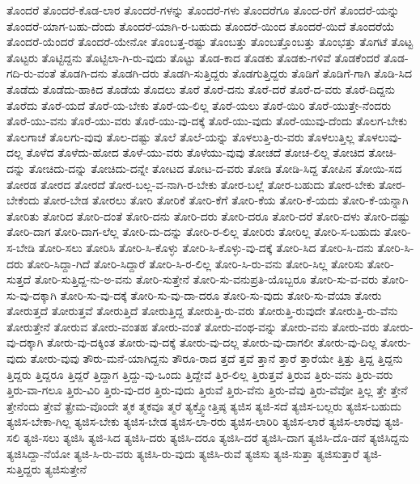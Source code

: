 {ತೊಂದರೆ
ತೊಂದರೆ-ಕೊಡ-ಲಾರ
ತೊಂದರೆ-ಗಳನ್ನು
ತೊಂದರೆ-ಗಳು
ತೊಂದರೆಗೂ
ತೊಂದ-ರೆಗೆ
ತೊಂದರೆ-ಯನ್ನು
ತೊಂದರೆ-ಯಾಗ-ಬಹು-ದೆಂದು
ತೊಂದರೆ-ಯಾಗಿ-ರ-ಬಹುದು
ತೊಂದರೆ-ಯಿಂದ
ತೊಂದರೆ-ಯಿದೆ
ತೊಂದರೆಯೆ
ತೊಂದರೆ-ಯೆಂದರೆ
ತೊಂದರೆ-ಯೇನೋ
ತೊಂಬತ್ತ-ರಷ್ಟು
ತೊಂಬತ್ತು
ತೊಂಬತ್ತೊಂಬತ್ತು
ತೊಂಭತ್ತು
ತೊಗಟೆ
ತೊಟ್ಟ
ತೊಟ್ಟರು
ತೊಟ್ಟಿದ್ದನು
ತೊಟ್ಟಿಲಾ-ಗಿ-ರು-ವುದು
ತೊಟ್ಟು
ತೊಡ-ಕಾದ
ತೊಡಕು
ತೊಡಕು-ಗಳಿವೆ
ತೊಡಕೆಂದರೆ
ತೊಡ-ಗದಿ-ರು-ವಂತೆ
ತೊಡಗಿ-ದನು
ತೊಡಗಿ-ದರು
ತೊಡಗಿ-ಸುತ್ತಿದ್ದರು
ತೊಡಗುತ್ತಿದ್ದರು
ತೊಡಿಗೆ
ತೊಡಿಗೆ-ಗಾಗಿ
ತೊಡಿ-ಸಿದ
ತೊಡೆದು
ತೊಡೆದು-ಹಾಕಿದ
ತೊಡೆಯ
ತೊದಲು
ತೊರೆ
ತೊರೆ-ದನು
ತೊರೆ-ದರೆ
ತೊರೆ-ದ-ವರು
ತೊರೆ-ದಿದ್ದನು
ತೊರೆದು
ತೊರೆ-ಯದೆ
ತೊರೆ-ಯ-ಬೇಕು
ತೊರೆ-ಯ-ಲಿಲ್ಲ
ತೊರೆ-ಯಲು
ತೊರೆ-ಯಿರಿ
ತೊರೆ-ಯುತ್ತೇ-ನೆಂದರು
ತೊರೆ-ಯು-ವನು
ತೊರೆ-ಯು-ವರು
ತೊರೆ-ಯು-ವು-ದಕ್ಕೆ
ತೊರೆ-ಯು-ವುದು
ತೊರೆ-ಯುವು-ದೆಂದು
ತೊಲಗ-ಬೇಕು
ತೊಲಗಾಚೆ
ತೊಲಗು-ವುವು
ತೊಲ-ದಷ್ಟು
ತೊಲೆ
ತೊಲೆ-ಯನ್ನು
ತೊಳಲುತ್ತಿ-ರು-ವರು
ತೊಳಲುತ್ತಿಲ್ಲ
ತೊಳಲುವು-ದಲ್ಲ
ತೊಳೆದ
ತೊಳೆದು-ಹೋದ
ತೊಳೆ-ಯು-ವರು
ತೊಳೆಯು-ವುವು
ತೋಚದೆ
ತೋಚ-ಲಿಲ್ಲ
ತೋಚಿದ
ತೋಚಿ-ದನ್ನು
ತೋಚಿದು-ದನ್ನು
ತೋಚಿದು-ದನ್ನೇ
ತೋಟದ
ತೋಟ-ದ-ವರು
ತೋಡಿ
ತೋಡಿ-ಸಿದ್ದ
ತೋಪಿನ
ತೋಯಿ-ಸದ
ತೋರಡ
ತೋರದ
ತೋರದೆ
ತೋರ-ಬಲ್ಲ-ವ-ನಾಗಿ-ರ-ಬೇಕು
ತೋರ-ಬಲ್ಲೆ
ತೋರ-ಬಹುದು
ತೋರ-ಬೇಕು
ತೋರ-ಬೇಕೆಂದು
ತೋರ-ಬೇಡ
ತೋರಲು
ತೋರಿ
ತೋರಿಕೆ
ತೋರಿ-ಕೆಗೆ
ತೋರಿ-ಕೆಯ
ತೋರಿ-ಕೆ-ಯದು
ತೋರಿ-ಕೆ-ಯನ್ನಾಗಿ
ತೋರಿತು
ತೋರಿದ
ತೋರಿ-ದಂತೆ
ತೋರಿ-ದನು
ತೋರಿ-ದರು
ತೋರಿ-ದರೂ
ತೋರಿ-ದರೆ
ತೋರಿ-ದಳು
ತೋರಿ-ದಷ್ಟು
ತೋರಿ-ದಾಗ
ತೋರಿ-ದಾಗ-ಲೆಲ್ಲ
ತೋರಿ-ದು-ದನ್ನು
ತೋರಿ-ರ-ಲಿಲ್ಲ
ತೋರಿರು
ತೋರಿಲ್ಲ
ತೋರಿ-ಸ-ಬಹುದು
ತೋರಿ-ಸ-ಬೇಡಿ
ತೋರಿ-ಸಲು
ತೋರಿಸಿ
ತೋರಿ-ಸಿ-ಕೊಳ್ಳು
ತೋರಿ-ಸಿ-ಕೊಳ್ಳು-ವು-ದಕ್ಕೆ
ತೋರಿ-ಸಿದ
ತೋರಿ-ಸಿ-ದನು
ತೋರಿ-ಸಿ-ದರು
ತೋರಿ-ಸಿದ್ದಾ-ಗಿದೆ
ತೋರಿ-ಸಿದ್ದಾರೆ
ತೋರಿ-ಸಿ-ರ-ಲಿಲ್ಲ
ತೋರಿ-ಸಿ-ರು-ವನು
ತೋರಿ-ಸಿಲ್ಲ
ತೋರಿಸು
ತೋರಿ-ಸುತ್ತದೆ
ತೋರಿ-ಸುತ್ತಿದ್ದ-ನು-ಅ-ವನು
ತೋರಿ-ಸುತ್ತೇನೆ
ತೋರಿ-ಸು-ವನುಪ್ರತಿ-ಯೊಬ್ಬರೂ
ತೋರಿ-ಸು-ವ-ವರು
ತೋರಿ-ಸು-ವು-ದಕ್ಕಾಗಿ
ತೋರಿ-ಸು-ವು-ದಕ್ಕೆ
ತೋರಿ-ಸು-ವು-ದಾ-ದರೂ
ತೋರಿ-ಸು-ವುದು
ತೋರಿ-ಸು-ವೆಯಾ
ತೋರು
ತೋರುತ್ತದೆ
ತೋರುತ್ತವೆ
ತೋರುತ್ತಿದೆ
ತೋರುತ್ತಿದ್ದ
ತೋರುತ್ತಿ-ರು-ವರು
ತೋರುತ್ತಿ-ರುವುದೇ
ತೋರುತ್ತಿ-ರು-ವೆನು
ತೋರುತ್ತೇನೆ
ತೋರುವ
ತೋರು-ವಂತಹ
ತೋರು-ವಂತೆ
ತೋರು-ವಂಥ-ವನ್ನು
ತೋರು-ವನು
ತೋರು-ವರು
ತೋರು-ವು-ದಕ್ಕಾಗಿ
ತೋರು-ವು-ದಕ್ಕಿಂತ
ತೋರು-ವು-ದಕ್ಕೆ
ತೋರು-ವು-ದಲ್ಲ
ತೋರು-ವು-ದಾಗಲೀ
ತೋರು-ವು-ದಿಲ್ಲ
ತೋರು-ವುದು
ತೋರು-ವುವು
ತೌರು-ಮನೆ-ಯಾಗಿದ್ದನು
ತೌರೂ-ರಾದ
ತ್ತದೆ
ತ್ತವೆ
ತ್ತಾನೆ
ತ್ತಾರೆ
ತ್ತಾರೆಯೇ
ತ್ತಿತ್ತು
ತ್ತಿದ್ದ
ತ್ತಿದ್ದನು
ತ್ತಿದ್ದರು
ತ್ತಿದ್ದರೂ
ತ್ತಿದ್ದರೆ
ತ್ತಿದ್ದಾಗ
ತ್ತಿದ್ದು-ವು-ಒಂದು
ತ್ತಿದ್ದೇವೆ
ತ್ತಿರ-ಲಿಲ್ಲ
ತ್ತಿರುತ್ತವೆ
ತ್ತಿರುವ
ತ್ತಿರು-ವನು
ತ್ತಿರು-ವರು
ತ್ತಿರು-ವಾ-ಗಲೂ
ತ್ತಿರು-ವಿರಿ
ತ್ತಿರು-ವು-ದರ
ತ್ತಿರು-ವುದು
ತ್ತಿರುವೆ
ತ್ತಿರು-ವೆನು
ತ್ತಿರು-ವೆವು
ತ್ತಿರು-ವೆವೋ
ತ್ತಿಲ್ಲ
ತ್ತೇ
ತ್ತೇನೆ
ತ್ತೇನೆಂದು
ತ್ತೇವೆ
ತ್ಪ್ರೇಮ-ವೊಂದೇ
ತ್ಮಕ
ತ್ಮಕವೂ
ತ್ಮರೆ
ತ್ಯಕ್ತ್ವೋತ್ತಿಷ್ಠ
ತ್ಯಜಿಸ
ತ್ಯಜಿ-ಸದೆ
ತ್ಯಜಿಸ-ಬಲ್ಲರು
ತ್ಯಜಿಸ-ಬಹುದು
ತ್ಯಜಿಸ-ಬೇಕಾ-ಗಿಲ್ಲ
ತ್ಯಜಿಸ-ಬೇಕು
ತ್ಯಜಿಸ-ಬೇಡ
ತ್ಯಜಿಸ-ಲಾ-ರರು
ತ್ಯಜಿಸ-ಲಾರಿರಿ
ತ್ಯಜಿಸ-ಲಾರೆ
ತ್ಯಜಿಸ-ಲಾರೆವು
ತ್ಯಜಿ-ಸಲಿ
ತ್ಯಜಿ-ಸಲು
ತ್ಯಜಿಸಿ
ತ್ಯಜಿ-ಸಿದ
ತ್ಯಜಿಸಿ-ದರು
ತ್ಯಜಿಸಿ-ದರೂ
ತ್ಯಜಿಸಿ-ದರೆ
ತ್ಯಜಿಸಿ-ದಾಗ
ತ್ಯಜಿಸಿ-ದೊ-ಡನೆ
ತ್ಯಜಿಸಿದ್ದನು
ತ್ಯಜಿಸಿದ್ದಾ-ನೆಯೋ
ತ್ಯಜಿ-ಸಿ-ರು-ವರು
ತ್ಯಜಿಸಿ-ರು-ವುದು
ತ್ಯಜಿಸಿ-ರುವೆ
ತ್ಯಜಿಸು
ತ್ಯಜಿ-ಸುತ್ತಾ
ತ್ಯಜಿಸುತ್ತಾರೆ
ತ್ಯಜಿ-ಸುತ್ತಿದ್ದರು
ತ್ಯಜಿಸುತ್ತೇನೆ
}
